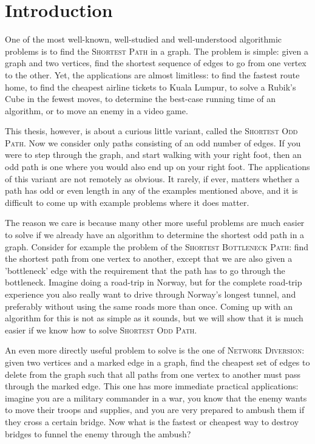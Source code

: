 \chapter{Introduction}

One of the most well-known, well-studied and well-understood algorithmic problems is to find the \textsc{Shortest Path} in a graph. The problem is simple: given a graph and two vertices, find the shortest sequence of edges to go from one vertex to the other. Yet, the applications are almost limitless: to find the fastest route home, to find the cheapest airline tickets to Kuala Lumpur, to solve a Rubik's Cube in the fewest moves, to determine the best-case running time of an algorithm, or to move an enemy in a video game.

This thesis, however, is about a curious little variant, called the \textsc{Shortest Odd Path}. Now we consider only paths consisting of an odd number of edges. If you were to step through the graph, and start walking with your right foot, then an odd path is one where you would also end up on your right foot. The applications of this variant are not remotely as obvious. It rarely, if ever, matters whether a path has odd or even length in any of the examples mentioned above, and it is difficult to come up with example problems where it does matter.

The reason we care is because many other more useful problems are much easier to solve if we already have an algorithm to determine the shortest odd path in a graph. Consider for example the problem of the \textsc{Shortest Bottleneck Path}: find the shortest path from one vertex to another, except that we are also given a 'bottleneck' edge with the requirement that the path has to go through the bottleneck. Imagine doing a road-trip in Norway, but for the complete road-trip experience you also really want to drive through Norway's longest tunnel, and preferably without using the same roads more than once. Coming up with an algorithm for this is not as simple as it sounds, but we will show that it is much easier if we know how to solve \textsc{Shortest Odd Path}.

An even more directly useful problem to solve is the one of \textsc{Network Diversion}: given two vertices and a marked edge in a graph, find the cheapest set of edges to delete from the graph such that all paths from one vertex to another must pass through the marked edge. This one has more immediate practical applications: imagine you are a military commander in a war, you know that the enemy wants to move their troops and supplies, and you are very prepared to ambush them if they cross a certain bridge. Now what is the fastest or cheapest way to destroy bridges to funnel the enemy through the ambush?

